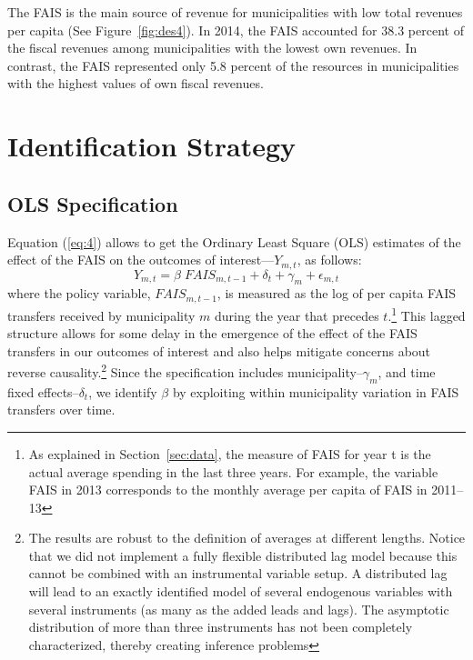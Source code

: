 \documentclass[dv_diss_main.tex]{subfiles}
\begin{document}
The FAIS is the main source of revenue for municipalities with low total revenues per capita (See Figure~\ref{fig:des4}). In 2014, the FAIS accounted for 38.3 percent of the fiscal revenues among municipalities with the lowest own revenues. In contrast, the FAIS represented only 5.8 percent of the resources in municipalities with the highest values of own fiscal revenues.



\section {Identification Strategy} \label{sec:strategy}
\subsection {OLS Specification} \label{subsec:ols}


Equation (\ref{eq:4}) allows to get the Ordinary Least Square (OLS) estimates of the effect of the FAIS on the outcomes of interest---$Y_{m,t}$, as follows:
\begin{equation}\label{eq:4}
Y_{m,t}= \beta\; FAIS_{m,t-1}+\delta_t+\gamma_m+\epsilon_{m,t}   
\end{equation}
\noindent where the policy variable, $FAIS_{m,t-1}$, is measured as the log of per capita FAIS transfers received by municipality $m$ during the year that precedes $t$.\footnote{As explained in Section~\ref{sec:data}, the measure of FAIS for year t is the actual average spending in the last three years. For example, the variable FAIS in 2013 corresponds to the monthly average per capita of FAIS in 2011–13} This lagged structure allows for some delay in the emergence of the effect of the FAIS transfers in our outcomes of interest and also helps mitigate concerns about reverse causality.\footnote{The results are robust to the definition of averages at different lengths. Notice that we did not implement a fully flexible distributed lag model because this cannot be combined with an instrumental variable setup. A distributed lag will lead to an exactly identified model of several endogenous variables with several instruments (as many as the added leads and lags). The asymptotic distribution of more than three instruments has not been completely characterized, thereby creating inference problems} Since the specification includes municipality--$\gamma_m$, and time fixed effects--$\delta_t$, we identify $\beta$ by exploiting within municipality variation in FAIS transfers over time.
\end{document}
